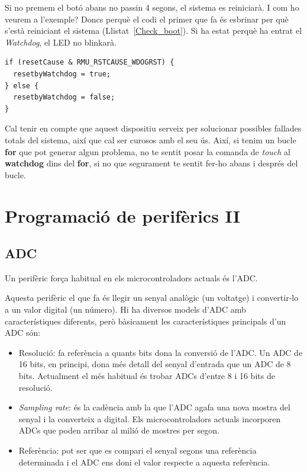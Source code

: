 Si no premem el botó abans no passin 4 segons, el sistema es reiniciarà. I com ho veurem a l'exemple? Doncs perquè el codi el primer que fa és esbrinar per què s'està reiniciant el sistema (Llistat~\ref{Check_boot}). Si ha estat perquè ha entrat el {\em Watchdog}, el LED no blinkarà.

\begin{lstlisting}[style=customc,caption={Codi per detectar la causa del reinici},label=Check_boot]
if (resetCause & RMU_RSTCAUSE_WDOGRST) {
  resetbyWatchdog = true;
} else {
  resetbyWatchdog = false;
}
\end{lstlisting}

Cal tenir en compte que aquest dispositiu serveix per solucionar possibles fallades totals del sistema, així que cal ser curosos amb el seu ús. Així, si tenim un bucle {\bf for} que pot generar algun problema, no te sentit posar la comanda de {\em touch} al {\bf watchdog} dins del {\bf for}, si no que segurament te sentit fer-ho abans i després del bucle.

\part{Programació de perifèrics II}
\label{part:programacio_2}

\chapter{ADC}
\label{sub:ADC}
Un perifèric força habitual en els microcontroladors actuals és l'\gls{ADC}.

Aquesta perifèric el que fa és llegir un senyal analògic (un voltatge) i convertir-lo a un valor digital (un número). Hi ha diversos models d'\gls{ADC} amb característiques diferents, però bàsicament les característiques principals d'un ADC són:
\begin{itemize}
 \item Resolució: fa referència a quants bits dona la conversió de l'ADC. Un ADC de 16 bits, en principi, dona més detall del senyal d'entrada que un ADC de 8 bits. Actualment el més habitual és trobar ADCs d'entre 8 i 16 bits de resolució.
 \item {\em Sampling rate}: és la cadència amb la que l'ADC agafa una nova mostra del senyal i la converteix a digital. Els microcontroladors actuals incorporen ADCs que poden arribar al milió de mostres per segon.
 \item Referència: pot ser que es compari el senyal segons una referència determinada i el ADC ens doni el valor respecte a aquesta referència.
\end{itemize}

